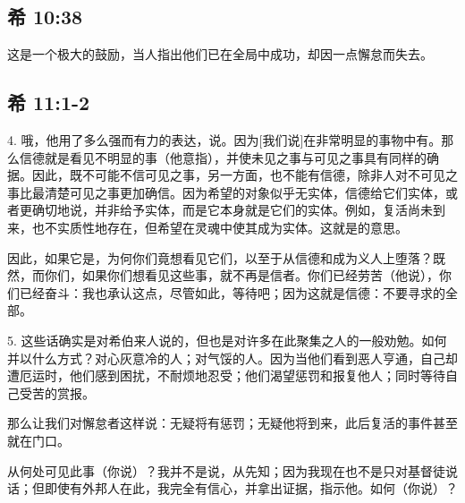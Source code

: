 
\subsection{希 10:38}

  这是一个极大的鼓励，当人指出他们已在全局中成功，却因一点懈怠而失去。 \par


\subsection{希 11:1-2}

4. 哦，他用了多么强而有力的表达，说。因为[我们说]在非常明显的事物中有。那么信德就是看见不明显的事（他意指），并使未见之事与可见之事具有同样的确据。因此，既不可能不信可见之事，另一方面，也不能有信德，除非人对不可见之事比最清楚可见之事更加确信。因为希望的对象似乎无实体，信德给它们实体，或者更确切地说，并非给予实体，而是它本身就是它们的实体。例如，复活尚未到来，也不实质性地存在，但希望在灵魂中使其成为实体。这就是的意思。\par

因此，如果它是，为何你们竟想看见它们，以至于从信德和成为义人上堕落？既然，而你们，如果你们想看见这些事，就不再是信者。你们已经劳苦（他说），你们已经奋斗：我也承认这点，尽管如此，等待吧；因为这就是信德：不要寻求的全部。\par

5. 这些话确实是对希伯来人说的，但也是对许多在此聚集之人的一般劝勉。如何并以什么方式？对心灰意冷的人；对气馁的人。因为当他们看到恶人亨通，自己却遭厄运时，他们感到困扰，不耐烦地忍受；他们渴望惩罚和报复他人；同时等待自己受苦的赏报。\par

那么让我们对懈怠者这样说：无疑将有惩罚；无疑他将到来，此后复活的事件甚至就在门口。\par

从何处可见此事（你说）？我并不是说，从先知；因为我现在也不是只对基督徒说话；但即使有外邦人在此，我完全有信心，并拿出证据，指示他。如何（你说）？\par

